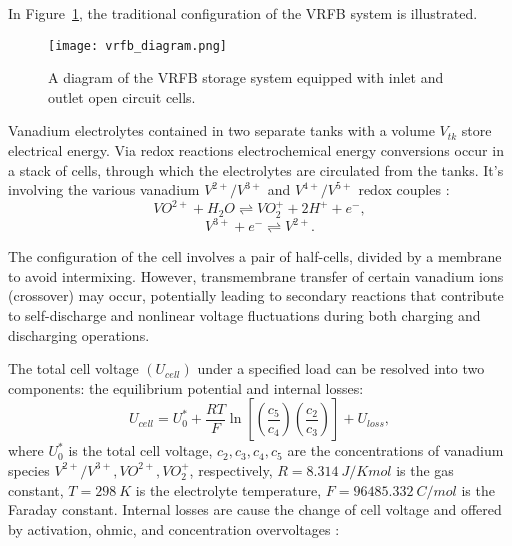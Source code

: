 
In Figure~\cref{fig:vrfb_st}, the traditional configuration of the VRFB system is illustrated.
 \begin{figure}[t]
    \centering
    \texttt{[image: vrfb\_diagram.png]}
    \caption{A diagram of the VRFB storage system equipped with inlet and outlet open circuit cells.}
    \label{fig:vrfb_st}
\end{figure}
Vanadium electrolytes contained in two separate tanks with a volume $V_{tk}$ store electrical energy. Via redox reactions electrochemical energy conversions occur in a stack of cells, through which the electrolytes are circulated from the tanks. It's involving the various vanadium $V^{2+}/V^{3+}$ and $V^{4+}/V^{5+}$ redox couples \autocite{ng_understanding_2010}:
\begin{equation}
    \label{eq:redox_pos}
        VO^{2+} + H_2O \rightleftharpoons VO^+_2 + 2H^+ + e^-,
\end{equation}
\begin{equation}
    \label{eq:redox_neg}
        V^{3+} + e^- \rightleftharpoons V^{2+}.
\end{equation}

The configuration of the cell involves a pair of half-cells, divided by a membrane to avoid intermixing. However, transmembrane transfer of certain vanadium ions (crossover) may occur, potentially leading to secondary reactions that contribute to self-discharge and nonlinear voltage fluctuations during both charging and discharging operations.

The total cell voltage $(U_{cell})$ under a specified load can be resolved into two components: the equilibrium potential and internal losses:
\begin{equation}
    \label{eq:nernst}
        U_{cell} = U_0^* + \dfrac{RT}{F} \ln{ \left[ \left(\dfrac{c_{5}}{c_{4}}\right)\left(\dfrac{c_{2}}{c_{3}}\right) \right] } + U_{loss},
\end{equation}
where $U_0^*$ is the total cell voltage, $c_2,c_3,c_4,c_5$ are the concentrations of vanadium species $V^{2+}/V^{3+}, VO^{2+},VO_{2}^+$, respectively, $R=\SI{8.314}{J/Kmol}$ is the gas constant, $T=\SI{298}{K}$ is the electrolyte temperature, $F=\SI{96485.332}{C/mol}$ is the Faraday constant. Internal losses are cause the change of cell voltage and offered by activation, ohmic, and concentration overvoltages \autocite{pugach_zero_2018}:

